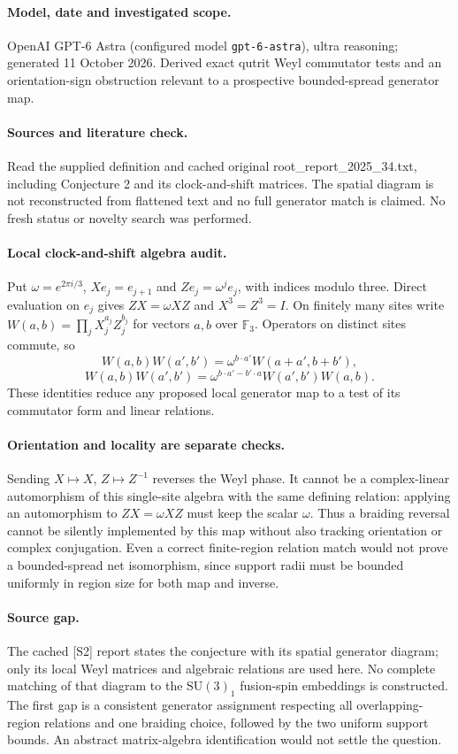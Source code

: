 \documentclass[11pt]{article}
\begin{document}
\paragraph{Model, date and investigated scope.}
OpenAI GPT-6 Astra (configured model \texttt{gpt-6-astra}), ultra reasoning; generated 11 October 2026. Derived exact qutrit Weyl commutator tests and an orientation-sign obstruction relevant to a prospective bounded-spread generator map.

\paragraph{Sources and literature check.}
Read the supplied definition and cached original root\_report\_2025\_34.txt, including Conjecture 2 and its clock-and-shift matrices. The spatial diagram is not reconstructed from flattened text and no full generator match is claimed. No fresh status or novelty search was performed.

\paragraph{Local clock-and-shift algebra audit.} Put \(\omega=e^{2\pi i/3}\), \(Xe_j=e_{j+1}\) and \(Ze_j=\omega^je_j\), with indices modulo three. Direct evaluation on \(e_j\) gives \(ZX=\omega XZ\) and \(X^3=Z^3=I\). On finitely many sites write \(W(a,b)=\prod_jX_j^{a_j}Z_j^{b_j}\) for vectors \(a,b\) over \(\mathbb F_3\). Operators on distinct sites commute, so
\[
 W(a,b)W(a',b')=\omega^{b\cdot a'}W(a+a',b+b'),
\]
\[
 W(a,b)W(a',b')=\omega^{b\cdot a'-b'\cdot a}W(a',b')W(a,b).
\]
These identities reduce any proposed local generator map to a test of its commutator form and linear relations.
\paragraph{Orientation and locality are separate checks.} Sending \(X\mapsto X\), \(Z\mapsto Z^{-1}\) reverses the Weyl phase. It cannot be a complex-linear automorphism of this single-site algebra with the same defining relation: applying an automorphism to \(ZX=\omega XZ\) must keep the scalar \(\omega\). Thus a braiding reversal cannot be silently implemented by this map without also tracking orientation or complex conjugation. Even a correct finite-region relation match would not prove a bounded-spread net isomorphism, since support radii must be bounded uniformly in region size for both map and inverse.
\paragraph{Source gap.} The cached [S2] report states the conjecture with its spatial generator diagram; only its local Weyl matrices and algebraic relations are used here. No complete matching of that diagram to the \(\mathrm{SU}(3)_1\) fusion-spin embeddings is constructed. The first gap is a consistent generator assignment respecting all overlapping-region relations and one braiding choice, followed by the two uniform support bounds. An abstract matrix-algebra identification would not settle the question.
\end{document}
